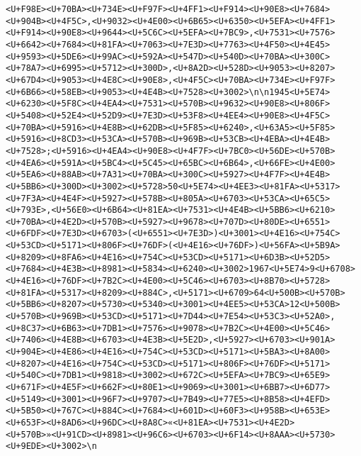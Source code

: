 \documentclass[
]{article}
\begin{document}
\begin{verbatim}
<U+F98E><U+70BA><U+734E><U+F97F><U+4FF1><U+F914><U+90E8><U+7684><U+904B><U+4F5C>,<U+9032><U+4E00><U+6B65><U+6350><U+5EFA><U+4FF1><U+F914><U+90E8><U+9644><U+5C6C><U+5EFA><U+7BC9>,<U+7531><U+7576><U+6642><U+7684><U+81FA><U+7063><U+7E3D><U+7763><U+4F50><U+4E45><U+9593><U+5DE6><U+99AC><U+592A><U+547D><U+540D><U+70BA><U+300C><U+78A7><U+6995><U+5712><U+300D>,<U+8A2D><U+528D><U+9053><U+8207><U+67D4><U+9053><U+4E8C><U+90E8>,<U+4F5C><U+70BA><U+734E><U+F97F><U+6B66><U+58EB><U+9053><U+4E4B><U+7528><U+3002>\n\n1945<U+5E74><U+6230><U+5F8C><U+4EA4><U+7531><U+570B><U+9632><U+90E8><U+806F><U+5408><U+52E4><U+52D9><U+7E3D><U+53F8><U+4EE4><U+90E8><U+4F5C><U+70BA><U+5916><U+4E8B><U+62DB><U+5F85><U+6240>,<U+63A5><U+5F85><U+5916><U+8CD3><U+53CA><U+570B><U+969B><U+53CB><U+4EBA><U+4E4B><U+7528>;<U+5916><U+4EA4><U+90E8><U+4F7F><U+7BC0><U+56DE><U+570B><U+4EA6><U+591A><U+5BC4><U+5C45><U+65BC><U+6B64>,<U+66FE><U+4E00><U+5EA6><U+88AB><U+7A31><U+70BA><U+300C><U+5927><U+4F7F><U+4E4B><U+5BB6><U+300D><U+3002><U+5728>50<U+5E74><U+4EE3><U+81FA><U+5317><U+7F3A><U+4E4F><U+5927><U+578B><U+805A><U+6703><U+53CA><U+65C5><U+793E>,<U+56E0><U+6B64><U+81EA><U+7531><U+4E4B><U+5BB6><U+6210><U+70BA><U+4E2D><U+570B><U+5927><U+9678><U+707D><U+80DE><U+6551><U+6FDF><U+7E3D><U+6703>(<U+6551><U+7E3D>)<U+3001><U+4E16><U+754C><U+53CD><U+5171><U+806F><U+76DF>(<U+4E16><U+76DF>)<U+56FA><U+5B9A><U+8209><U+8FA6><U+4E16><U+754C><U+53CD><U+5171><U+6D3B><U+52D5><U+7684><U+4E3B><U+8981><U+5834><U+6240><U+3002>1967<U+5E74>9<U+6708><U+4E16><U+76DF><U+7B2C><U+4E00><U+5C46><U+6703><U+8B70><U+5728><U+81FA><U+5317><U+8209><U+884C>,<U+5171><U+6709>64<U+500B><U+570B><U+5BB6><U+8207><U+5730><U+5340><U+3001><U+4EE5><U+53CA>12<U+500B><U+570B><U+969B><U+53CD><U+5171><U+7D44><U+7E54><U+53C3><U+52A0>,<U+8C37><U+6B63><U+7DB1><U+7576><U+9078><U+7B2C><U+4E00><U+5C46><U+7406><U+4E8B><U+6703><U+4E3B><U+5E2D>,<U+5927><U+6703><U+901A><U+904E><U+4E86><U+4E16><U+754C><U+53CD><U+5171><U+5BA3><U+8A00><U+8207><U+4E16><U+754C><U+53CD><U+5171><U+806F><U+76DF><U+5171><U+540C><U+7DB1><U+9818><U+3002><U+672C><U+5EFA><U+7BC9><U+65E9><U+671F><U+4E5F><U+662F><U+80E1><U+9069><U+3001><U+6BB7><U+6D77><U+5149><U+3001><U+96F7><U+9707><U+7B49><U+77E5><U+8B58><U+4EFD><U+5B50><U+767C><U+884C><U+7684><U+601D><U+60F3><U+958B><U+653E><U+653F><U+8AD6><U+96DC><U+8A8C>«<U+81EA><U+7531><U+4E2D><U+570B>»<U+91CD><U+8981><U+96C6><U+6703><U+6F14><U+8AAA><U+5730><U+9EDE><U+3002>\n

\end{verbatim}
\end{document}
